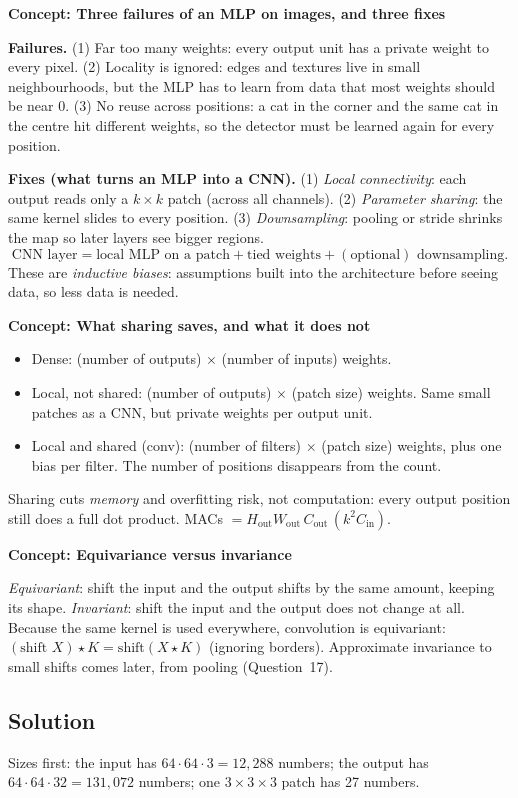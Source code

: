 \documentclass[12pt,a4paper]{article}
\newcommand{\concept}[2]{\par\medskip\phantomsection\label{#1}{\large\bfseries\color{blue!50!black} Concept: #2}\par}
\begin{document}
\concept{c:threechoices}{Three failures of an MLP on images, and three fixes}
\textbf{Failures.} (1) Far too many weights: every output unit has a private weight to every pixel. (2) Locality is ignored: edges and textures live in small neighbourhoods, but the MLP has to learn from data that most weights should be near 0. (3) No reuse across positions: a cat in the corner and the same cat in the centre hit different weights, so the detector must be learned again for every position.

\textbf{Fixes (what turns an MLP into a CNN).} (1) \emph{Local connectivity}: each output reads only a $k\times k$ patch (across all channels). (2) \emph{Parameter sharing}: the same kernel slides to every position. (3) \emph{Downsampling}: pooling or stride shrinks the map so later layers see bigger regions.
\[
\text{CNN layer}=\text{local MLP on a patch}+\text{tied weights}+(\text{optional})\text{ downsampling}.
\]
These are \emph{inductive biases}: assumptions built into the architecture before seeing data, so less data is needed.

\concept{c:sharing}{What sharing saves, and what it does not}
\begin{itemize}[nosep]
\item Dense: (number of outputs) $\times$ (number of inputs) weights.
\item Local, not shared: (number of outputs) $\times$ (patch size) weights. Same small patches as a CNN, but private weights per output unit.
\item Local and shared (conv): (number of filters) $\times$ (patch size) weights, plus one bias per filter. The number of positions disappears from the count.
\end{itemize}
Sharing cuts \emph{memory} and overfitting risk, not computation: every output position still does a full dot product. MACs $=H_{\text{out}}W_{\text{out}}\,C_{\text{out}}\,(k^2C_{\text{in}})$.

\concept{c:equivariance}{Equivariance versus invariance}
\emph{Equivariant}: shift the input and the output shifts by the same amount, keeping its shape. \emph{Invariant}: shift the input and the output does not change at all. Because the same kernel is used everywhere, convolution is equivariant: $(\text{shift }X)\star K=\text{shift}(X\star K)$ (ignoring borders). Approximate invariance to small shifts comes later, from pooling (Question~17).

\subsection*{Solution}
Sizes first: the input has $64\cdot64\cdot3=12{,}288$ numbers; the output has $64\cdot64\cdot32=131{,}072$ numbers; one $3\times3\times3$ patch has 27 numbers.
\end{document}
